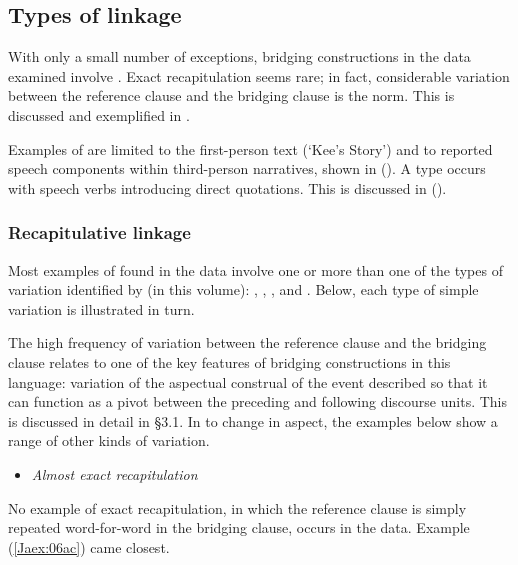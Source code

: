 \documentclass[output=paper]{LSP/langsci}
\begin{document}
\subsection{Types of linkage}
\label{Jatypes}
With only a small number of exceptions, bridging constructions in the  data examined involve . Exact recapitulation seems rare; in fact, considerable variation between the reference clause and the bridging clause is the norm. This is discussed and exemplified in . 
 
Examples of  are limited to the first-person text (`Kee’s Story') and to reported speech components within third-person narratives, shown in (). A  type occurs with speech verbs introducing direct quotations. This is discussed in ().
 
\subsubsection{Recapitulative linkage}
\label{JaRecapitulative}
Most examples of  found in the data involve one or more than one of the types of variation identified by \citeauthor{guerin18} (in this volume): , , , and . Below, each type of simple variation is illustrated in turn.
 
The high frequency of variation between the reference clause and the bridging clause relates to one of the key features of bridging constructions in this language: variation of the aspectual construal of the event described so that it can function as a pivot between the preceding and following discourse units. This is discussed in detail in §3.1. In  to change in aspect, the examples below show a range of other kinds of variation.
 

\begin{itemize}
\item \textit{Almost exact recapitulation}
\end{itemize}

No example of exact recapitulation, in which the reference clause is simply repeated word-for-word in the bridging clause, occurs in the data. Example (\ref{Jaex:06ac}) came closest.
\end{document}
